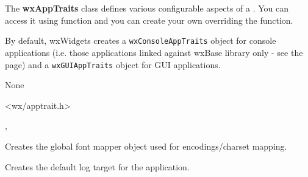 
\section{}\label{wxapptraits}

The {\bf wxAppTraits} class defines various configurable aspects of a .
You can access it using  function and you can
create your own  overriding the
 function.

By default, wxWidgets creates a {\tt wxConsoleAppTraits} object for console applications
(i.e. those applications linked against wxBase library only - see the
 page) and a {\tt wxGUIAppTraits} object for GUI
applications.


None


<wx/apptrait.h>


, 



\label{wxapptraitscreatefontmapper}


Creates the global font mapper object used for encodings/charset mapping.



\label{wxapptraitscreatelogtarget}


Creates the default log target for the application.


\label{wxapptraitscreatemessageoutput}

